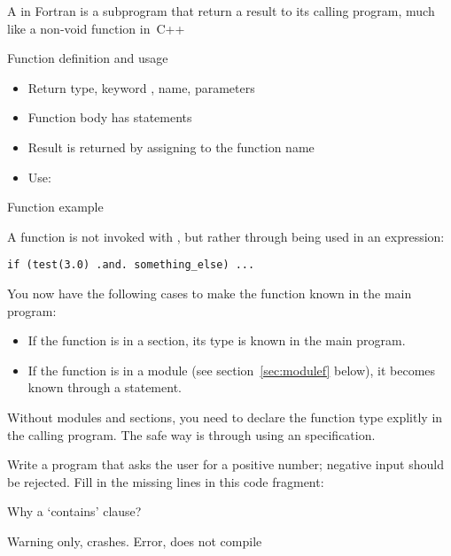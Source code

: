 A  in Fortran is a subprogram that return a
result to its calling program, much like a non-void function in~C++

\begin{block}{Function definition and usage}
  \label{sl:ffunction-def}
  \begin{itemize}
  \item Return type, keyword , name, parameters
  \item Function body has statements
  \item Result is returned by assigning to the function name
  \item Use: 
  \end{itemize}
\end{block}

\begin{block}{Function example}
  \label{sl:ffunction-ex}
\end{block}

A function is not invoked with , but rather through being used
in an expression:
\begin{verbatim}
if (test(3.0) .and. something_else) ...
\end{verbatim}
You now have the following cases to make the function known in the
main program:
\begin{itemize}
\item If the function is in a  section, its type is known
  in the main program.
\item If the function is in a module (see section~\ref{sec:modulef}
  below), it becomes known through a  statement.
\end{itemize}

\begin{f77note}
  Without modules and  sections, you need to declare the
  function type explitly in the calling program. The safe way is
  through using an  specification.
\end{f77note}

\begin{exercise}
  \label{ex:freadpos}
  Write a program that asks the user for a positive number; negative
  input should be rejected.  Fill in the missing lines in this code
  fragment:
\end{exercise}

\begin{block}{Why a `contains' clause?}
  \label{sl:whycontain}
  \begin{multicols}{2}
    Warning only, crashes.
    \vfill\columnbreak
    Error, does not compile
  \end{multicols}
\end{block}

